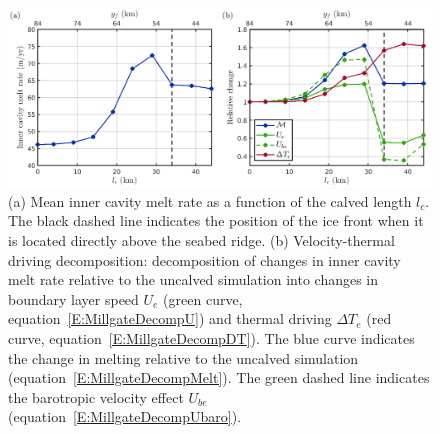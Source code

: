 \documentclass[draft]{agujournal2019}
\begin{document}
\begin{figure}
    \centering
    \includegraphics[width = \textwidth]{../make_figures/plots/figure4.png}
    \caption{(a) Mean inner cavity melt rate as a function of the calved length $l_c$. The black dashed line indicates the position of the ice front when it is located directly above the seabed ridge. (b) Velocity-thermal driving decomposition: decomposition of changes in inner cavity melt rate relative to the uncalved simulation into changes in boundary layer speed $U_e$ (green curve, equation~\eqref{E:MillgateDecompU}) and thermal driving $\Delta T_e$ (red curve, equation~\eqref{E:MillgateDecompDT}). The blue curve indicates the change in melting relative to the uncalved simulation (equation~\eqref{E:MillgateDecompMelt}). The green dashed line indicates the barotropic velocity effect $U_{be}$ (equation~\eqref{E:MillgateDecompUbaro}).  }
    \label{fig:figure4}
\end{figure}
\end{document}
